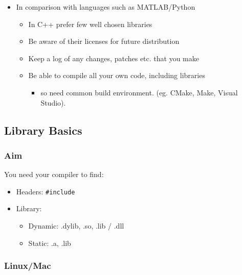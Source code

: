 \begin{itemize}
\itemsep1pt\parskip0pt
\item
  In comparison with languages such as MATLAB/Python

  \begin{itemize}
  \itemsep1pt\parskip0pt
  \item
    In C++ prefer few well chosen libraries
  \item
    Be aware of their licenses for future distribution
  \item
    Keep a log of any changes, patches etc. that you make
  \item
    Be able to compile all your own code, including libraries

    \begin{itemize}
    \itemsep1pt\parskip0pt
    \item
      so need common build environment. (eg. CMake, Make, Visual
      Studio).
    \end{itemize}
  \end{itemize}
\end{itemize}

\subsection{Library Basics}\label{library-basics}

\subsubsection{Aim}\label{aim}

You need your compiler to find:

\begin{itemize}
\itemsep1pt\parskip0pt
\item
  Headers: \texttt{\#include}
\item
  Library:

  \begin{itemize}
  \itemsep1pt\parskip0pt
  \item
    Dynamic: .dylib, .so, .lib / .dll
  \item
    Static: .a, .lib
  \end{itemize}
\end{itemize}

\subsubsection{Linux/Mac}\label{linuxmac}

